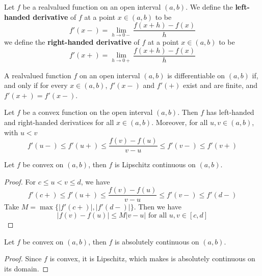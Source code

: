 \begin{definition}
    Let $f$ be a realvalued function on an open interval $(a,b)$. We define the
    \textbf{left-handed derivative} of $f$ at a point  $x \in (a,b)$ to be
    \begin{equation*}
        f'(x-)=\lim_{h \xrightarrow{} 0-}{\frac{f(x+h)-f(x)}{h}}
    \end{equation*}
    we define the \textbf{right-handed derivative} of $f$ at a point $x \in
    (a,b)$ to be
    \begin{equation*}
        f'(x+)=\lim_{h \xrightarrow{} 0+}{\frac{f(x+h)-f(x)}{h}}
    \end{equation*}
\end{definition}

\begin{lemma}\label{11.5.3}
    A realvalued function $f$ on an open interval  $(a,b)$ is differentiable on
    $(a,b)$ if, and only if for every  $x \in (a,b)$, $f'(x-)$ and $f'(+)$ exist
    and are finite, and $f'(x+)=f'(x-)$.
\end{lemma}

\begin{lemma}\label{11.5.4}
    Let $f$ be a convex function on the open interval $(a,b)$. Then $f$ has
    left-handed and right-handed derivatices for all $x \in (a,b)$. Moreover,
    for all $u,v \in (a,b)$, with $u<v$
    \begin{equation*}
        f'(u-) \leq f'(u+) \leq \frac{f(v)-f(u)}{v-u} \leq f'(v-) \leq f'(v+)
    \end{equation*}
\end{lemma}
\begin{corollary}
    Let $f$ be convex on  $(a,b)$, then $f$ is Lipschitz continuous on $(a,b)$.
\end{corollary}
\begin{proof}
    For $c \leq u<v \leq d$, we have
    \begin{equation*}
        f'(c+) \leq f'(u+) \leq \frac{f(v)-f(u)}{v-u} \leq f'(v-) \leq f'(d-)
    \end{equation*}
    Take $M=\max{\{|f'(c+)|,|f'(d-)|\}}$. Then we have
    \begin{equation*}
        |f(v)-f(u)| \leq M|v-u| \text{ for all } u,v \in [c,d]
    \end{equation*}
\end{proof}
\begin{corollary}
    Let $f$ be convex on $(a,b)$, then $f$ is absolutely continuous on $(a,b)$.
\end{corollary}
\begin{proof}
    Since $f$ is convex, it is Lipschitz, which makes is absolutely continuous
    on its domain.
\end{proof}

